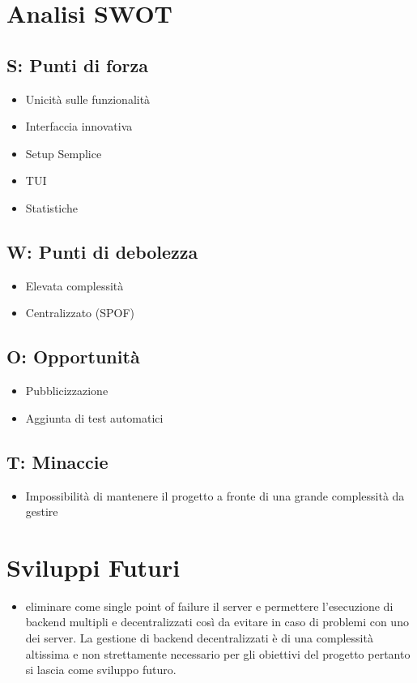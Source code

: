 \documentclass[11pt]{article}
\begin{document}
\section{Analisi SWOT}
\subsection{S: Punti di forza}
\begin{itemize}
	\item Unicità sulle funzionalità
	\item Interfaccia innovativa
	\item Setup Semplice
	\item TUI
	\item Statistiche
\end{itemize}
\subsection{W: Punti di debolezza}
\begin{itemize}
	\item Elevata complessità
	\item Centralizzato (SPOF)
\end{itemize}
\subsection{O: Opportunità}
\begin{itemize}
	\item Pubblicizzazione
	\item Aggiunta di test automatici
\end{itemize}
\subsection{T: Minaccie}
\begin{itemize}
	\item Impossibilità di mantenere il progetto a fronte di una grande complessità da gestire
\end{itemize}
\section{Sviluppi Futuri}
\begin{itemize}
	\item eliminare come single point of failure il server e permettere l'esecuzione di backend multipli e decentralizzati così da evitare in caso di problemi con uno dei server. La gestione di backend decentralizzati è di una complessità altissima e non strettamente necessario per gli obiettivi del progetto pertanto si lascia come sviluppo futuro.
\end{itemize}
\end{document}
